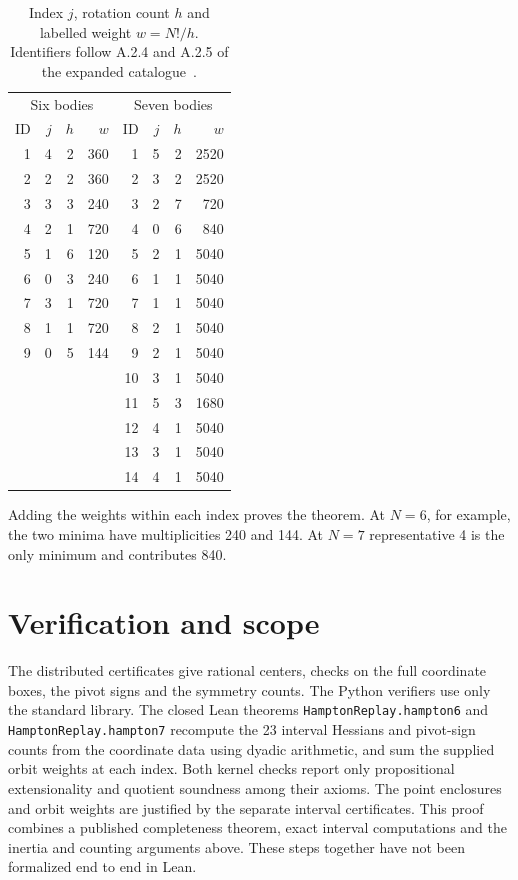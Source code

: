 \documentclass[10pt]{article}
\begin{document}
\begin{table}[H]
\centering
\caption{Index $j$, rotation count $h$ and labelled weight $w=N!/h$. Identifiers follow A.2.4 and A.2.5 of the expanded catalogue~\cite{mz}.}
\smallskip
\begin{tabular}{rrrr@{\qquad\qquad}rrrr}
\toprule
\multicolumn{4}{c}{Six bodies}&\multicolumn{4}{c}{Seven bodies}\\
ID&$j$&$h$&$w$&ID&$j$&$h$&$w$\\
\midrule
1&4&2&360&1&5&2&2520\\
2&2&2&360&2&3&2&2520\\
3&3&3&240&3&2&7&720\\
4&2&1&720&4&0&6&840\\
5&1&6&120&5&2&1&5040\\
6&0&3&240&6&1&1&5040\\
7&3&1&720&7&1&1&5040\\
8&1&1&720&8&2&1&5040\\
9&0&5&144&9&2&1&5040\\
&&&&10&3&1&5040\\
&&&&11&5&3&1680\\
&&&&12&4&1&5040\\
&&&&13&3&1&5040\\
&&&&14&4&1&5040\\
\bottomrule
\end{tabular}
\end{table}

Adding the weights within each index proves the theorem. At $N=6$, for example, the two minima have multiplicities 240 and 144. At $N=7$ representative 4 is the only minimum and contributes 840.

\section{Verification and scope}
The distributed certificates give rational centers, checks on the full coordinate boxes, the pivot signs and the symmetry counts. The Python verifiers use only the standard library. The closed Lean theorems \texttt{HamptonReplay.hampton6} and \texttt{HamptonReplay.hampton7} recompute the 23 interval Hessians and pivot-sign counts from the coordinate data using dyadic arithmetic, and sum the supplied orbit weights at each index. Both kernel checks report only propositional extensionality and quotient soundness among their axioms. The point enclosures and orbit weights are justified by the separate interval certificates. This proof combines a published completeness theorem, exact interval computations and the inertia and counting arguments above. These steps together have not been formalized end to end in Lean.
\end{document}
